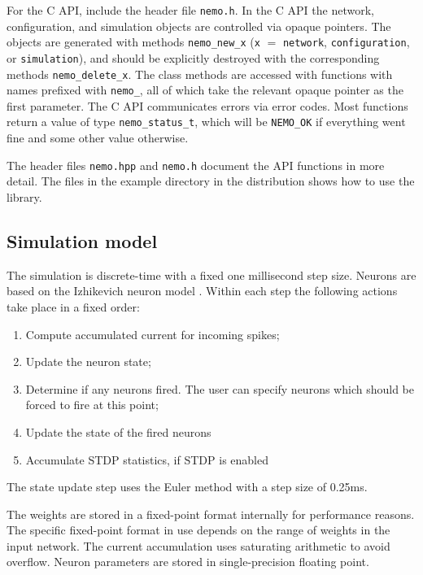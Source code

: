 \documentclass[a4paper]{article}
\newcommand{\code}[1]{\texttt{#1}}
\newcommand{\file}[1]{\texttt{#1}}
\begin{document}
For the C API, include the header file \file{nemo.h}. 
In the C API the network, configuration, and simulation objects are controlled
via opaque pointers.
The objects are generated with methods 
\code{nemo\_new\_x} (\code{x} $=$ \code{network}, \code{configuration}, or \code{simulation}),
and should be explicitly destroyed with the corresponding methods 
\code{nemo\_delete\_x}.
The class methods are accessed with functions with names prefixed with \code{nemo\_},
	all of which take the relevant opaque pointer as the first parameter.
The C API communicates errors via error codes.
Most functions return a value of type \code{nemo\_status\_t},
	which will be \code{NEMO\_OK} if everything went fine and some other value otherwise.

The header files \file{nemo.hpp} and \file{nemo.h} document the API functions in more detail.
The files in the example directory in the distribution shows how to use the library.

\subsection{Simulation model}

The simulation is discrete-time with a fixed one millisecond step size.
Neurons are based on the Izhikevich neuron model \cite{izhikevich2003simple_model}.
Within each step the following actions take place in a fixed order:

\begin{enumerate}
	\item Compute accumulated current for incoming spikes;
	\item Update the neuron state;
	\item Determine if any neurons fired. The user can specify neurons which should be forced to fire at this point;
	\item Update the state of the fired neurons
	\item Accumulate STDP statistics, if STDP is enabled
\end{enumerate}

The state update step uses the Euler method with a step size of 0.25ms. 

The weights are stored in a fixed-point format internally for performance reasons.
The specific fixed-point format in use depends on the range of weights in the input network.
The current accumulation uses saturating arithmetic to avoid overflow.
Neuron parameters are stored in single-precision floating point.
\end{document}
